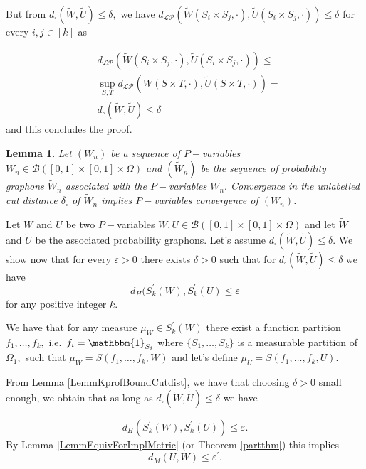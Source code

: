 \documentclass[11pt]{article}
\newtheorem{lemma}[theorem]{Lemma}
\newcommand{\cB}{{\mathcal B}}  %
\begin{document}
But from $d_{\square}(\widetilde W, \widetilde U)\leq \delta,$ we have $d_{\mathcal{LP}}(\widetilde W(S_i\times S_j,\cdot),\widetilde U(S_i\times S_j,\cdot))\leq \delta$ for every $i,j\in [k]$ as

$$
\begin{aligned}
&d_{\mathcal{LP}}(\widetilde W(S_i\times S_j,\cdot),\widetilde U(S_i\times S_j,\cdot))\leq\\
& \sup_{S,T} d_{\mathcal{LP}}(\widetilde W(S\times T,\cdot),\widetilde U(S\times T,\cdot))=\\
& d_{\square}(\widetilde W, \widetilde U)\leq \delta
\end{aligned}
$$
and this concludes the proof.

\endproof

\begin{lemma}\label{LemmUnlabelledCutImplies}
Let $(W_n)$ be a sequence of $P-$variables $W_n\in \cB([0,1]\times [0,1]\times \Omega) $ and $(\widetilde W_n)$ be the sequence of probability graphons $\widetilde W_n$ associated with the $P-$variables $W_n.$ Convergence in the unlabelled cut distance $\delta_{\square}$ of $\widetilde W_n$ implies $P-$variables convergence of $(W_n)$.
\end{lemma}
\proof
Let $W$ and $U$ be two $P-$variables $W,U\in \cB([0,1]\times [0,1]\times \Omega)$ and let $\widetilde W$ and $\widetilde U$ be the associated probability graphons. Let's assume $d_{\square}(\widetilde W, \widetilde U)\leq \delta.$ We show now that for every $\varepsilon>0$ there exists $\delta>0$ such that for $d_{\square}(\widetilde W, \widetilde U)\leq \delta$ we have
$$d_H(S^{\prime}_k(W),S^{\prime}_k(U)\leq \varepsilon$$for any positive integer $k.$

We have that for any measure $\mu_W \in S^{\prime}_k(W)$ there exist a function partition $f_1,\ldots,f_k,$ i.e.\ $f_i=\mathbbm{1}_{S_i}$ where $\{S_1,\ldots,S_k\}$ is a measurable partition of $\Omega_1,$ such that $\mu_W=S(f_1,\ldots,f_k,W)$ and let's define $\mu_U=S(f_1,\ldots,f_k,U).$

From Lemma \ref{LemmKprofBoundCutdist}, we have that choosing $\delta>0$ small enough, we obtain that as long as $d_{\square}(\widetilde W, \widetilde U)\leq \delta$ we have

$$d_H(S^{\prime}_k(W),S^{\prime}_k(U))\leq \varepsilon.$$%
By Lemma \ref{LemmEquivForImplMetric} (or Theorem \ref{partthm}) this implies
$$
d_M(U,W)\leq \varepsilon^{\prime} .%
$$
\end{document}

